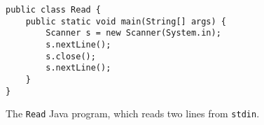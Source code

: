 \begin{listing}
    \centering
    \begin{verbatim}
public class Read {
    public static void main(String[] args) {
        Scanner s = new Scanner(System.in);
        s.nextLine();
        s.close();
        s.nextLine();
    }
}
    \end{verbatim}
    \caption{The \texttt{Read} Java program, which reads two lines from \texttt{stdin}.}
    \label{lst:java-read}
\end{listing}